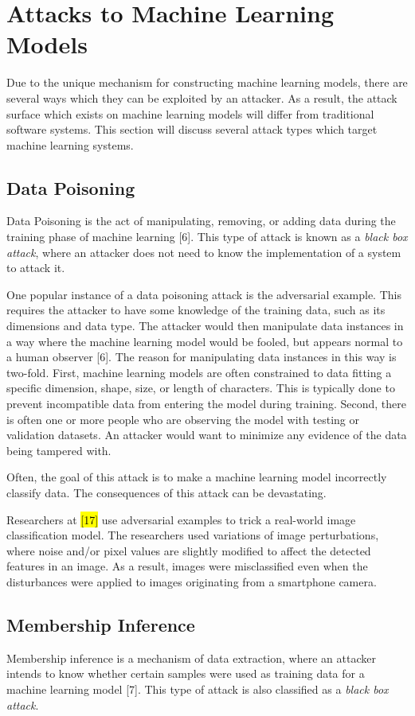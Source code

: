\documentclass[11pt,conference]{IEEEtran}
\begin{document}
\section{Attacks to Machine Learning Models}
Due to the unique mechanism for constructing machine learning models, there are
several ways which they can be exploited by an attacker. As a result, the
attack surface which exists on machine learning models will differ from
traditional software systems.
This section will discuss several attack types which target machine learning
systems.

\subsection{Data Poisoning}
Data Poisoning is the act of manipulating, removing, or adding
data during the training phase of machine learning [6]. This type of attack is
known as a \emph{black box attack}, where an attacker does not need to know the
implementation of a system to attack it.

One popular instance of a data poisoning attack is the adversarial
example. This requires the attacker to have some knowledge of the
training data, such as its dimensions and data type. The attacker would then
manipulate data instances in a way where the machine learning model would
be fooled, but appears normal to a human observer [6]. The reason for manipulating
data instances in this way is two-fold. First, machine learning models are
often constrained to data fitting a specific dimension, shape, size, or length
of characters. This is typically done to prevent incompatible data from
entering the model during training. Second, there is often one or more people
who are observing the model with testing or validation datasets. An attacker
would want to minimize any evidence of the data being tampered with.

Often, the goal of this
attack is to make a machine learning model incorrectly classify data. The
consequences of this attack can be devastating. 

Researchers at \hl{[17]} use adversarial examples to trick a real-world image
classification model. The researchers used variations of image perturbations, where noise
and/or pixel values are slightly modified to affect the detected features in an
image. As a result, images were misclassified even when the disturbances were
applied to images originating from a smartphone camera.

\subsection{Membership Inference}
Membership inference is a mechanism of data extraction, where an attacker 
intends to know whether certain samples were used as training data for a
machine learning model [7]. This type of attack is also classified as a \emph{black box attack}.
\end{document}
